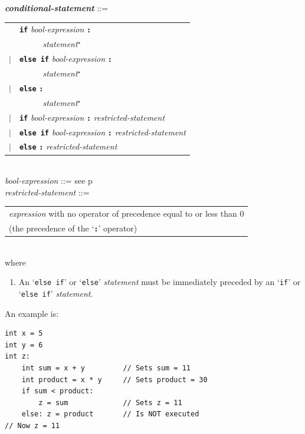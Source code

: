 \documentclass[12pt]{article}
\newcommand{\TT}[1]{{\tt \bfseries #1}}
\newcommand{\STAR}{{\Large $^\star$}}
\newcommand{\ttkey}[1]{{\tt \bfseries #1}}
\newcommand{\emkey}[1]{{\em \bfseries #1}}
\newcommand{\pagref}[1]{p\pageref{#1}}
\newenvironment{indpar}[1][0.3in]%
	{\begin{list}{}%
		     {\setlength{\itemsep}{0in}%
		      \setlength{\topsep}{0in}%
		      \setlength{\parsep}{1ex}%
		      \setlength{\labelwidth}{#1}%
		      \setlength{\leftmargin}{#1}%
		      \addtolength{\leftmargin}{\labelsep}}%
	 \item}%
	{\end{list}}
\begin{document}
\begin{indpar}
\emkey{conditional-statement} ::= \\
\hspace*{0.5in}\begin{tabular}[t]{rl}
        & \ttkey{if} {\em bool-expression} \TT{:} \\
	& ~~~~~ {\em statement}\STAR{} \\
    $|$ & \ttkey{else if} {\em bool-expression} \TT{:} \\
	& ~~~~~ {\em statement}\STAR{} \\
    $|$ & \ttkey{else} \TT{:} \\
	& ~~~~~ {\em statement}\STAR{} \\
    $|$ & \ttkey{if} {\em bool-expression} \TT{:} {\em restricted-statement} \\
    $|$ & \ttkey{else if} {\em bool-expression} \TT{:}
    		{\em restricted-statement} \\
    $|$ & \ttkey{else} \TT{:} {\em restricted-statement} \\
	\end{tabular}
\\[0.5ex]
{\em bool-expression} ::= see \pagref{BOOL-EXPRESSION}
\\[0.5ex]
{\em restricted-statement}\label{RESTRICTED-STATEMENT} ::= \\
\hspace*{0.5in}\begin{tabular}[t]{@{}l}
   {\em expression} with no operator of precedence equal to or less than 0 \\
   (the precedence of the `\TT{:}' operator) \\
   \end{tabular}
\\[1ex]
where
\begin{enumerate}
\item An `{\tt else if}' or `{\tt else}' {\em statement} must be immediately
preceded by an `{\tt if}' or `{\tt else if}' {\em statement}.
\end{enumerate}
\end{indpar}

An example is:
\begin{indpar}\begin{verbatim}
int x = 5
int y = 6
int z:
    int sum = x + y         // Sets sum = 11
    int product = x * y     // Sets product = 30
    if sum < product:
        z = sum             // Sets z = 11
    else: z = product       // Is NOT executed
// Now z = 11
\end{verbatim}\end{indpar}
\end{document}
